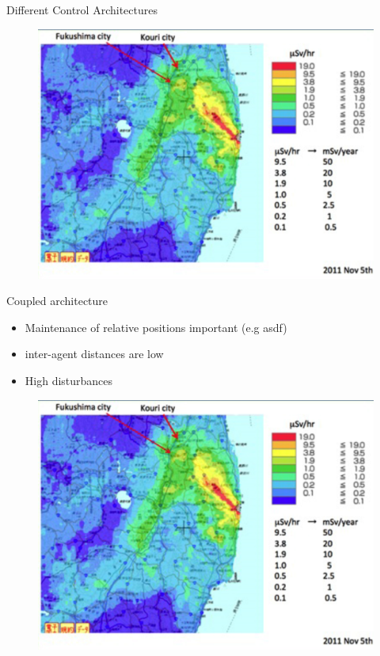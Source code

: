 \begin{frame}{Different Control Architectures}	
	\begin{minipage}{0.45\textwidth}	
		\begin{figure}
			\includegraphics[width=1\textwidth]{figures/fukushima_disaster.jpg}
		\end{figure}
		Coupled architecture
		\begin{itemize}
		\item Maintenance of relative positions important (e.g asdf) 
		\item inter-agent distances are low
		\item High disturbances
		\end{itemize}
	\end{minipage}
	\hspace{0.05cm}
	\begin{minipage}{0.45\textwidth}
			\begin{figure}
			\includegraphics[width=1\textwidth]{figures/fukushima_disaster.jpg}

\end{figure}
\end{minipage}
\end{frame}
